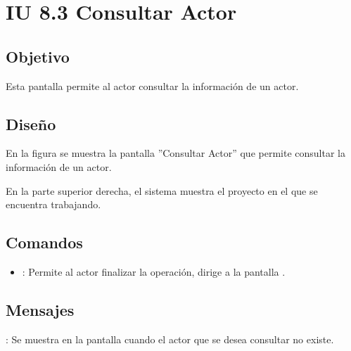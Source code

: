 \section{IU 8.3 Consultar Actor}

\subsection{Objetivo}
	Esta pantalla permite al actor consultar la información de un actor.
\subsection{Diseño}
	En la figura  se muestra la pantalla ''Consultar Actor'' que permite consultar la información de un actor.
	
	En la parte superior derecha, el sistema muestra el proyecto en el que se encuentra trabajando.

\subsection{Comandos}
\begin{itemize}
	\item {}: Permite al actor finalizar la operación, dirige a la pantalla .
\end{itemize}

\subsection{Mensajes}

\begin{Citemize}
	\item {}: Se muestra en la pantalla  cuando el actor que se desea consultar no existe.
\end{Citemize}

